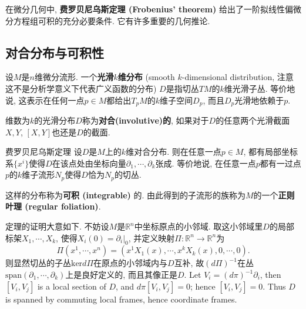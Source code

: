 
在微分几何中, \textbf{费罗贝尼乌斯定理 (Frobenius' theorem)} 给出了一阶拟线性偏微分方程组可积的充分必要条件. 它有许多重要的几何推论.

\subsection{对合分布与可积性}
设$M$是$n$维微分流形. 一个\textbf{光滑$k$维分布} (smooth $k$-dimensional distribution, 注意这不是分析学意义下代表广义函数的分布) $D$是指切丛$TM$的$k$维光滑子丛. 等价地说, 这表示在任何一点$p\in M$都给出$T_pM$的$k$维子空间$D_p$, 而且$D_p$光滑地依赖于$p$. 

维数为$k$的光滑分布$D$称为\textbf{对合(involutive)的}, 如果对于$D$的任意两个光滑截面$X,Y$, $[X,Y]$也还是$D$的截面. 

\begin{theorem}{费罗贝尼乌斯定理}
设$D$是$M$上的$k$维对合分布. 则在任意一点$p\in M$, 都有局部坐标系$\{x^i\}$使得$D$在该点处由坐标向量$\partial_1,\cdots ,\partial_k$张成. 等价地说, 在任意一点$p$都有一过点$p$的$k$维子流形$N_p$使得$D$恰为$N_p$的切丛.
\end{theorem}
这样的分布称为\textbf{可积 (integrable)} 的. 由此得到的子流形的族称为$M$的一个\textbf{正则叶理 (regular foliation)}.

定理的证明大意如下. 不妨设$M$是$\mathbb{R}^n$中坐标原点的小邻域. 取这小邻域里$D$的局部标架$X_1,\cdots ,X_k$, 使得$X_i(0)=\partial_i|_0$, 并定义映射$\Pi: \mathbb{R}^n\to \mathbb{R}^n$为
$$
\Pi(x^1,\cdots ,x^n)=(x^1X_1(x),\cdots ,x^kX_k(x),0,\cdots ,0).
$$
则显然切丛的子丛$\text{ker}d\Pi$在原点的小邻域内与$D$互补, 故$(d\Pi)^{-1}$在丛$\text{span}(\partial_1,\cdots ,\partial_k)$上是良好定义的, 而且其像正是$D$. Let $V_i=(d\pi)^{-1}\partial_i$, then $[V_i,V_j]$ is a local section of $D$, and $d\pi[V_i,V_j]=0$; hence $[V_i,V_j]=0$. Thus $D$ is spanned by commuting local frames, hence coordinate frames.

